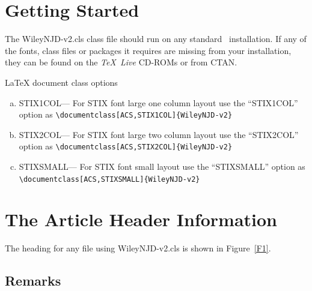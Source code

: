 \documentclass[ACS,STIX1COL]{WileyNJD-v2}
\begin{document}
\section{Getting Started} The \textsf{WileyNJD-v2.cls} class file should run
on any standard \LaTeXe\ installation. If any of the fonts, class
files or packages it requires are missing from your installation,
they can be found on the \emph{\TeX\ Live} CD-ROMs or from CTAN.

LaTeX document class options

\begin{flushleft}
\begin{enumerate}[a.]
\item STIX1COL--- For STIX font large one column layout use the ``STIX1COL'' option as \verb"\documentclass[ACS,STIX1COL]{WileyNJD-v2}"
\item STIX2COL--- For STIX font large two column layout use the ``STIX2COL'' option as \verb"\documentclass[ACS,STIX2COL]{WileyNJD-v2}"
\item STIXSMALL--- For STIX font small layout use the ``STIXSMALL'' option as \verb"\documentclass[ACS,STIXSMALL]{WileyNJD-v2}"
\end{enumerate}
\end{flushleft}



\section{The Article Header Information}
The heading for any file using \textsf{WileyNJD-v2.cls} is shown in
Figure~\ref{F1}.

\subsection{Remarks}
\end{document}
